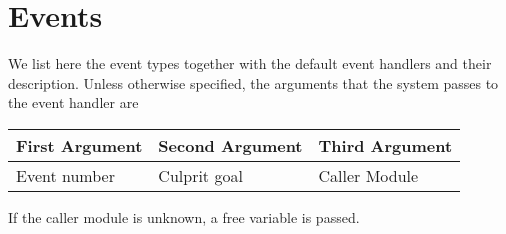 %
% 
% 
% 
% 
%
%
%
%
%
%
\chapter{Events}
\label{errors}
\label{chaperrors}

We list here the {\eclipse} event types together with the default
event handlers and their description.
Unless otherwise specified, the arguments that the system passes
to the event handler are

\vspace{0.3cm}
\noindent
\begin{tabular}{p{4cm}p{4cm}p{4cm}}
{\bf First Argument} & {\bf Second Argument} & {\bf Third Argument} \\
\hline
Event number & Culprit goal & Caller Module \\
\end{tabular}

\vspace{0.3cm}
\noindent
If the caller module is unknown, a free variable is passed.

